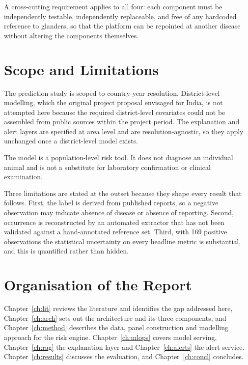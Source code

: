 \documentclass[10pt,openany]{report}
\begin{document}
A cross-cutting requirement applies to all four: each component must be independently testable,
independently replaceable, and free of any hardcoded reference to glanders, so that the platform
can be repointed at another disease without altering the components themselves.

\section{Scope and Limitations}

The prediction study is scoped to country-year resolution. District-level modelling, which the
original project proposal envisaged for India, is not attempted here because the required
district-level covariates could not be assembled from public sources within the project period.
The explanation and alert layers are specified at area level and are resolution-agnostic, so they
apply unchanged once a district-level model exists.

The model is a population-level risk tool. It does not diagnose an individual animal and is not
a substitute for laboratory confirmation or clinical examination.

Three limitations are stated at the outset because they shape every result that follows. First,
the label is derived from published reports, so a negative observation may indicate absence of
disease or absence of reporting. Second, occurrence is reconstructed by an automated extractor
that has not been validated against a hand-annotated reference set. Third, with 169 positive
observations the statistical uncertainty on every headline metric is substantial, and this is
quantified rather than hidden.

\section{Organisation of the Report}

Chapter~\ref{ch:lit} reviews the literature and identifies the gap addressed here,
Chapter~\ref{ch:arch} sets out the architecture and its three components, and
Chapter~\ref{ch:method} describes the data, panel construction and modelling approach for the risk
engine. Chapter~\ref{ch:mlops} covers model serving, Chapter~\ref{ch:rag} the explanation layer and
Chapter~\ref{ch:alerts} the alert service. Chapter~\ref{ch:results} discusses the evaluation, and
Chapter~\ref{ch:concl} concludes.

\end{document}
